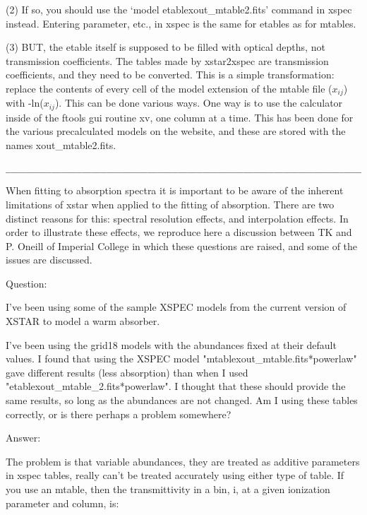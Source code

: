 (2) If so, you should use the `model etable{xout\_mtable2.fits}' command
in xspec instead.  Entering parameter, etc., in xspec is the same for 
etables as for mtables.

(3) BUT, the etable itself is supposed to be filled with optical depths, not
transmission coefficients.  The tables made by xstar2xspec are transmission coefficients,
and they need to be converted.  This is a simple transformation:  replace 
the contents of every cell of the model extension of the mtable file ($x_{ij}$)
with -ln($x_{ij}$).  This can be done various ways.  One way is to use the calculator 
inside of the ftools gui routine xv, one column at a time.  This has 
been done for the various precalculated models on the website, and these 
are stored with the names xout\_mtable2.fits.


\begin{verbatim}
_________________________________________________________________________________
\end{verbatim}


When fitting to absorption spectra it is important to 
be aware of  the inherent limitations of xstar when applied to the 
fitting of absorption.  There are two distinct reasons for this:
spectral resolution effects, and interpolation effects.
In order to illustrate these effects, we reproduce 
here a discussion between TK and P. Oneill of Imperial College in 
which these questions are raised, and some of the issues are discussed.

Question:

I've been using some of the sample XSPEC models from the current version 
of XSTAR to model a warm absorber.

I've been using the grid18 models with the abundances fixed at their 
default values. I found that using the XSPEC model 
"mtable{xout\_mtable.fits}*powerlaw" gave different results (less 
absorption) than when I used "etable{xout\_mtable\_2.fits}*powerlaw".  I 
thought that these should provide the same results, so long as the 
abundances are not changed. Am I using these tables correctly, or is 
there perhaps a problem somewhere?

Answer:

The problem is that variable abundances, they are treated as additive
parameters in xspec tables, really can't be treated 
accurately  using either type of table.  If you use an mtable, then 
the transmittivity in a bin, i, at a given ionization parameter and 
column, is:

